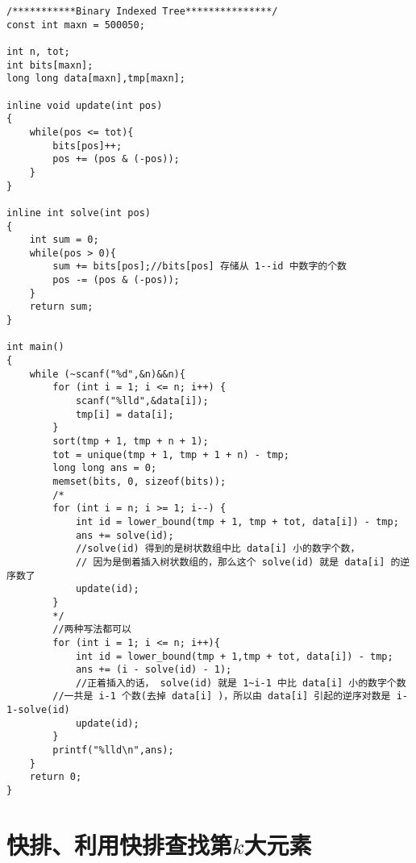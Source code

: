 \begin{lstlisting}
/***********Binary Indexed Tree***************/
const int maxn = 500050;

int n, tot;
int bits[maxn];
long long data[maxn],tmp[maxn];

inline void update(int pos)
{
    while(pos <= tot){
        bits[pos]++;
        pos += (pos & (-pos));
    }
}

inline int solve(int pos)
{
    int sum = 0;
    while(pos > 0){
        sum += bits[pos];//bits[pos] 存储从 1--id 中数字的个数
        pos -= (pos & (-pos));
    }
    return sum;
}

int main()
{
    while (~scanf("%d",&n)&&n){
        for (int i = 1; i <= n; i++) {
            scanf("%lld",&data[i]);
            tmp[i] = data[i];
        }
        sort(tmp + 1, tmp + n + 1);
        tot = unique(tmp + 1, tmp + 1 + n) - tmp;
        long long ans = 0;
        memset(bits, 0, sizeof(bits));
        /*
        for (int i = n; i >= 1; i--) {
            int id = lower_bound(tmp + 1, tmp + tot, data[i]) - tmp;
            ans += solve(id);
            //solve(id) 得到的是树状数组中比 data[i] 小的数字个数，
            // 因为是倒着插入树状数组的，那么这个 solve(id) 就是 data[i] 的逆序数了
            update(id);
        }
        */
        //两种写法都可以
        for (int i = 1; i <= n; i++){
            int id = lower_bound(tmp + 1,tmp + tot, data[i]) - tmp;
            ans += (i - solve(id) - 1);
            //正着插入的话， solve(id) 就是 1~i-1 中比 data[i] 小的数字个数
        //一共是 i-1 个数(去掉 data[i] )，所以由 data[i] 引起的逆序对数是 i-1-solve(id)
            update(id);
        }
        printf("%lld\n",ans);
    }
    return 0;
}
\end{lstlisting}

\section{快排、利用快排查找第$k$大元素}

